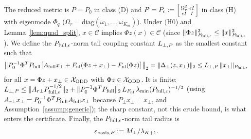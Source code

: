 The reduced metric is \(P = P_0\) in class (D) and \(P = P_\epsilon := \begin{bsmallmatrix} \Omega_r^2 & \epsilon I \\ \epsilon I & I \end{bsmallmatrix}\) in class (H) with eigenmode \(\Phi_q\) (\(\Omega_r = \mathrm{diag}(\omega_1,\dots,\omega_{K_m})\)). Under (H0) and Lemma~\ref{lem:quad_split}, \(x \in \mathcal{C}\) implies \(\Phi z(x) \in \mathcal{C}\) (since \(\|\Phi z\|_{P_{\mathrm{full},\epsilon}}^2 \le \|x\|_{P_{\mathrm{full},\epsilon}}^2\)). We define the \(P_{\mathrm{full},\epsilon}\)-norm tail coupling constant \(L_{\perp,P}\) as the smallest constant such that
\begin{equation}
\label{eq:Lperp_def}
\big\|P_0^{-1}\Phi^TP_{\mathrm{full}}\big[A_{\mathrm{full}} x_\perp + F_{\mathrm{nl}}(\Phi z + x_\perp) - F_{\mathrm{nl}}(\Phi z)\big]\big\|_2 = \|\Delta_\perp(z,x_\perp)\|_2 \le L_{\perp,P}\,\|x_\perp\|_{P_{\mathrm{full},\epsilon}}
\end{equation}
for all \(x = \Phi z + x_\perp \in \mathcal{X}_{\mathrm{ODD}}\) with \(\Phi z \in \mathcal{X}_{\mathrm{ODD}}\). It is finite: \(L_{\perp,P} \le \|A_{r\perp}P_{\mathrm{full},\epsilon}^{-1/2}\|_2 + \|P_0^{-1}\Phi^TP_{\mathrm{full}}\|_2\,L_{F_{\mathrm{nl}}}\,\lambda_{\min}(P_{\mathrm{full},\epsilon})^{-1/2}\) (using \(A_{r\perp}x_\perp = P_0^{-1}\Phi^TP_{\mathrm{full}}A_{\mathrm{full}} x_\perp\) because \(P_\perp x_\perp = x_\perp\), and Assumption~\ref{assump:generic}); the sharp constant, not this crude bound, is what enters the certificate. Finally, the \(P_{\mathrm{full},\epsilon}\)-norm tail radius is
\begin{equation}
\label{eq:eps_basis_P}
\varepsilon_{\mathrm{basis},P} := M_\perp/\lambda_{K+1} .
\end{equation}

